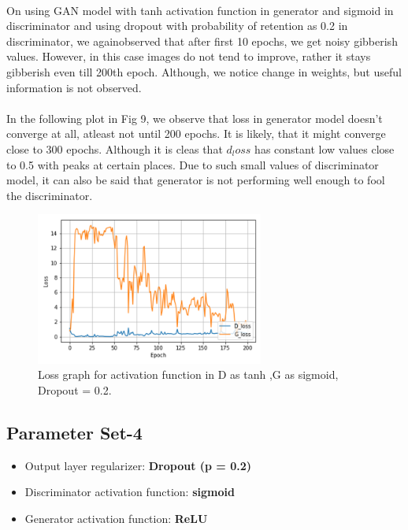 \documentclass{article}
\begin{document}
\paragraph{}
On using GAN model with tanh activation function in generator and sigmoid in discriminator and using dropout with probability of retention as 0.2 in discriminator, we  againobserved that after first 10 epochs, we get noisy gibberish values. However, in this case images do not tend to improve, rather it stays gibberish even till 200th epoch. Although, we notice change in weights, but useful information is not observed.
\paragraph{}
In the following plot in Fig 9, we observe that loss in generator model doesn’t converge at all, atleast not until 200 epochs. It is likely, that it might converge close to 300 epochs. Although it is cleas that $d_loss$ has constant low values close to 0.5 with peaks at certain places. Due to such small values of discriminator model, it can also be said that generator is not performing well enough to fool the discriminator.


\begin{figure}[H]
	\centering
	\includegraphics[width=7.5cm]{figs/Picture9}
	\caption{Loss graph for activation function in D as tanh ,G as sigmoid, Dropout = 0.2.}
\end{figure}


\subsection{Parameter Set-4}
\begin{itemize}
	\item Output layer regularizer: \textbf{Dropout (p = 0.2)}
	\item Discriminator activation function:  \textbf{sigmoid}
	\item Generator activation function:  \textbf{ReLU}
\end{itemize}
\end{document}
